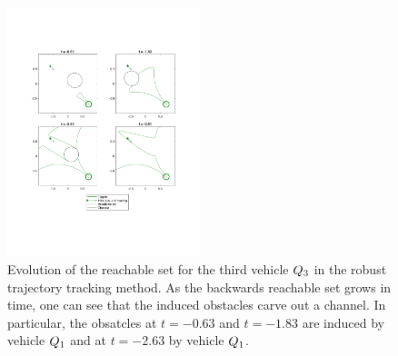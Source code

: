 \begin{figure}
  \centering
  \includegraphics[width=0.5\textwidth]{"fig/rtt_rs3"}
  \caption{Evolution of the reachable set for the third vehicle $Q_3$ in the robust trajectory tracking method. As the backwards reachable set grows in time, one can see that the induced obstacles carve out a channel. In particular, the obsatcles at $t =-0.63$ and $t=-1.83$ are induced by vehicle $Q_1$ and at $t =-2.63$ by vehicle $Q_1$.}
  \label{fig:rtt_rs3}
\end{figure}